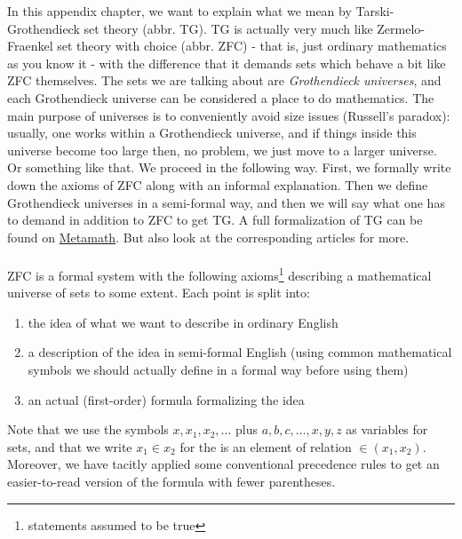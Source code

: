 In this appendix chapter, we want to explain what we mean by Tarski-Grothendieck set theory (abbr. TG).
TG is actually very much like Zermelo-Fraenkel set theory with choice (abbr. ZFC) - that is, just ordinary mathematics as you know it - with the difference that it demands sets which behave a bit like ZFC themselves. 
The sets we are talking about are \textit{Grothendieck universes}, and each Grothendieck universe can be considered a place to do mathematics.
The main purpose of universes is to conveniently avoid size issues (Russell's paradox): usually, one works within a Grothendieck universe, and if things inside this universe become too large then, no problem, we just move to a larger universe.
Or something like that.
We proceed in the following way.
First, we formally write down the axioms of ZFC along with an informal explanation.
Then we define Grothendieck universes in a semi-formal way, and then we will say what one has to demand in addition to ZFC to get TG.
A full formalization of TG can be found on \href{http://us.metamath.org/mpeuni/mmset.html}{Metamath}.
But also look at the corresponding \cite{wiki-pedia0en} articles for more.
\\\\
ZFC is a formal system with the following axioms\footnote{statements assumed to be true} describing a mathematical universe of sets to some extent.
Each point is split into:
\begin{enumerate}
\item[$\bullet$]
the idea of what we want to describe in ordinary English
\item[$\bullet$]
a description of the idea in semi-formal English (using common mathematical symbols we should actually define in a formal way before using them)
\item[$\bullet$]
an actual (first-order) formula formalizing the idea
\end{enumerate}
Note that we use the symbols $x,x_{1},x_{2},\ldots$ plus $a,b,c,\ldots,x,y,z$ as variables for sets, and that we write $x_{1} \in x_{2}$ for the {\glqq}is an element of{\grqq} relation $\in(x_{1},x_{2})$.
Moreover, we have tacitly applied some conventional precedence rules to get an easier-to-read version of the formula with fewer parentheses.

